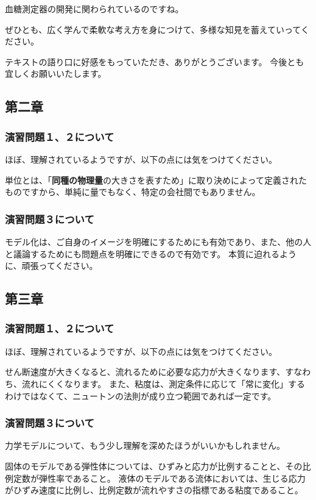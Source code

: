 \documentclass[uplatex,dvipdfmx,a4paper,11pt]{jsreport}
\begin{document}
血糖測定器の開発に関わられているのですね。

ぜひとも、広く学んで柔軟な考え方を身につけて、多様な知見を蓄えていってください。

テキストの語り口に好感をもっていただき、ありがとうございます。
今後とも宜しくお願いいたします。

\subsection*{第二章}
\subsubsection*{演習問題１、２について}
ほぼ、理解されているようですが、以下の点には気をつけてください。

単位とは、「\textbf{同種の物理量}の大きさを表すため」に取り決めによって定義されたものですから、単純に量でもなく、特定の会社間でもありません。

\subsubsection*{演習問題３について}

モデル化は、ご自身のイメージを明確にするためにも有効であり、また、他の人と議論するためにも問題点を明確にできるので有効です。
本質に迫れるように、頑張ってください。

\subsection*{第三章}
\subsubsection*{演習問題１、２について}
ほぼ、理解されているようですが、以下の点には気をつけてください。

せん断速度が大きくなると、流れるために必要な応力が大きくなります、すなわち、流れにくくなります。
また、粘度は、測定条件に応じて「常に変化」するわけではなくて、ニュートンの法則が成り立つ範囲であれば一定です。

\subsubsection*{演習問題３について}
力学モデルについて、もう少し理解を深めたほうがいいかもしれません。

固体のモデルである弾性体については、ひずみと応力が比例することと、その比例定数が弾性率であること。
液体のモデルである流体においては、生じる応力がひずみ速度に比例し、比例定数が流れやすさの指標である粘度であること。
\end{document}
